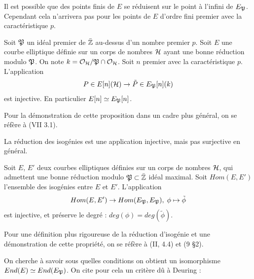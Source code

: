 Il est possible que des points finis de $E$ se réduisent sur le point à l'infini de $E_{\mathfrak{P}}$. Cependant cela n'arrivera pas pour les points de $E$ d'ordre fini premier avec la caractéristique $p$.

\begin{Prop}\label{ReductionPointInjectivité}
	Soit $\mathfrak{P}$ un idéal premier de $\bar{\mathbb{Z}}$ au-dessus d'un nombre premier $p$. Soit $E$ une courbe elliptique définie sur un corps de nombres $\mathcal{H}$ ayant une bonne réduction modulo $\mathfrak{P}$. On note $k = \mathcal{O}_{\mathcal{H}}/\mathfrak{P}\cap\mathcal{O}_{\mathcal{H}}$. Soit $n$ premier avec la caractéristique $p$. L'application
	\begin{equation*}
		P\in E[n](\mathcal{H}) \rightarrow \tilde{P}\in E_{\mathfrak{P}}[n](k)
	\end{equation*}
	est injective. En particulier $E[n]\simeq E_{\mathfrak{P}}[n]$.
\end{Prop}

\begin{Rem}
	Pour la démonstration de cette proposition dans un cadre plus général, on se réfère à \cite{Sil09}(VII 3.1).
\end{Rem}

La réduction des isogénies est une application injective, mais pas surjective en général. 

\begin{Prop}\label{reductionIsogenieInjectivité}
	Soit $E$, $E'$ deux courbes elliptiques définies sur un corps de nombres $\mathcal{H}$, qui admettent une bonne réduction modulo $\mathfrak{P}\subset\bar{\mathbb{Z}}$ idéal maximal. Soit $Hom(E, E')$ l'ensemble des isogénies entre $E$ et $E'$. L'application 
	\begin{equation*}
		Hom(E, E')\rightarrow Hom(E_{\mathfrak{P}}, E_{\mathfrak{P}}),\;\phi\mapsto\tilde{\phi}
	\end{equation*}
	est injective, et préserve le degré : $deg(\phi) = deg(\tilde{\phi})$.
	
\end{Prop}

\begin{Rem}
	Pour une définition plus rigoureuse de la réduction d'isogénie et une démonstration de cette propriété, on se réfère à \cite{Sil94}(II, 4.4) et \cite{Lang1987}(9 \S2).
\end{Rem}

On cherche à savoir sous quelles conditions on obtient un isomorphisme $End(E)\simeq End(E_{\mathfrak{P}})$. On cite pour cela un critère dû à Deuring :

